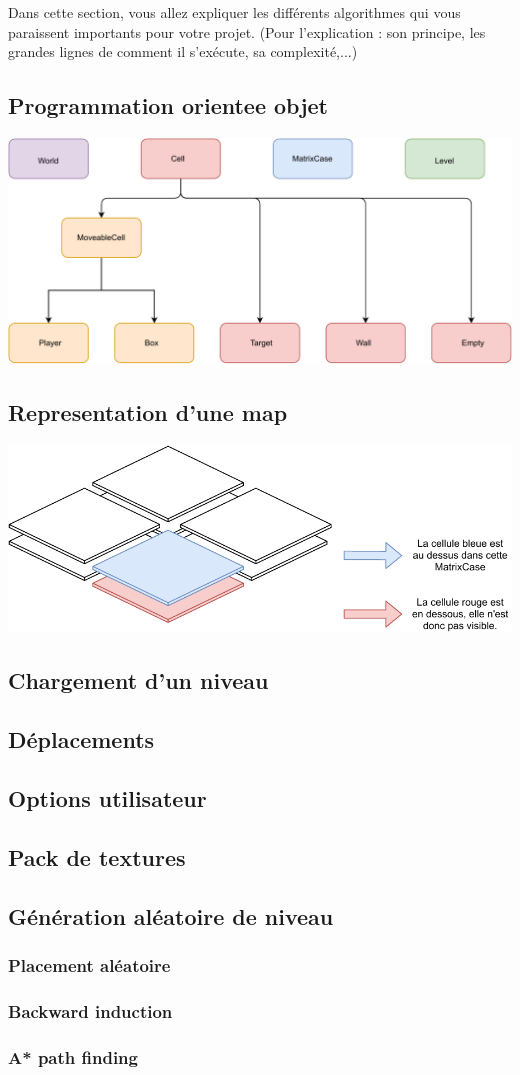 \documentclass[../main.tex]{subfiles}
\begin{document}
Dans cette section, vous allez expliquer les différents algorithmes qui vous paraissent importants pour votre projet. (Pour l'explication : son principe, les grandes lignes de comment il s'exécute, sa complexité,...)

\subsection{Programmation orientee objet}
\includegraphics[width=1\textwidth,clip]{images/objects.pdf}

\subsection{Representation d'une map}
\includegraphics[width=1\textwidth,clip]{images/matrixCase.pdf}

\subsection{Chargement d'un niveau}

\subsection{Déplacements}

\subsection{Options utilisateur}

\subsection{Pack de textures}

\subsection{Génération aléatoire de niveau}
\subsubsection{Placement aléatoire}
\subsubsection{Backward induction}
\subsubsection{A* path finding}
\end{document}
